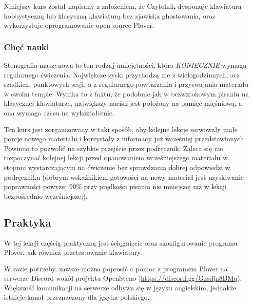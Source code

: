 \documentclass[12p, oneside]{book}
\begin{document}
Niniejszy kurs został napisany z założeniem, że Czytelnik dysponuje klawiaturą hobbystyczną lub klasyczną klawiaturą bez zjawiska ghostowania, oraz wykorzystuje oprogramowanie open-source Plover.

\subsubsection{Chęć nauki}
Stenografia maszynowa to ten rodzaj umiejętności, która \emph{KONIECZNIE} wymaga regularnego ćwiczenia. Największe zyski przychodzą nie z wielogodzinnych, acz rzadkich, punktowych sesji, a z regularnego powtarzania i przyswajania materiału w swoim tempie. Wynika to z faktu, że podobnie jak w bezwzrokowym pisaniu na klasycznej klawiaturze, największy nacisk jest położony na pamięć mięśniową, a ona wymaga czasu na wykształcenie.

Ten kurs jest zorganizowany w taki sposób, aby kolejne lekcje serwowały małe porcje nowego materiału i korzystały z informacji już wcześniej przedstawionych. Powinno to pozwolić na szybkie przejście przez podręcznik. Zaleca się nie rozpoczynać kolejnej lekcji przed opanowaniem wcześniejszego materiału w stopniu wystarczającym na ćwiczenie bez sprawdzania dobrej odpowiedzi w podręczniku (dobrym wskaźnikiem gotowości na nowy materiał jest uzyskiwanie poprawności powyżej 90\% przy prędkości pisania nie mniejszej niż w lekcji bezpośrednio wcześniejszej).

\subsection*{Praktyka}
W tej lekcji częścią praktyczną jest ściągnięcie oraz skonfigurowanie programu Plover, jak również przetestowanie klawiatury.

W razie potrzeby, zawsze można poprosić o pomoc z programem Plover na serwerze Discord wokół projektu OpenSteno (\url{https://discord.gg/Gzsdjn8BMq}). Większość komunikacji na serwerze odbywa się w języku angielskim, jednakże istnieje kanał przeznaczony dla języka polskiego.
\end{document}
